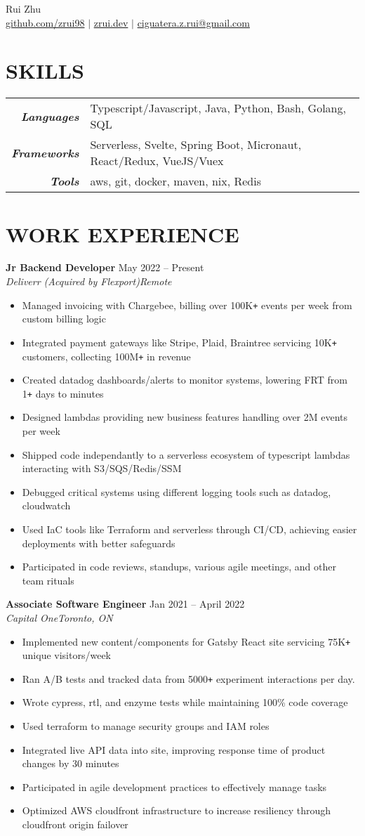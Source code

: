 \documentclass[letterpaper]{article}
\newcommand{\Header}[2]{\begin{center}
	\huge\usefont{OT1}{lmss}{m}{n}
		#1 \\
	\small{#2}
\end{center}}
\newcommand{\SplitEntry}[2]{\textbf{\textit{#1}} & \small{#2}\\}
\newcommand{\NewPart}[1]{\section*{\large\uppercase{\textbf{#1}}}}
\newcommand{\DatedEntry}[5]{\small\textbf{#1}
	\hfill \small{#2}\\
	\textit{#3}\hfill\textit{#4}\\\vspace{0.1cm}
	#5\vspace{0.1cm}
}
\begin{document}
\Header{Rui Zhu}{\href{https://github.com/zrui98}{github.com/zrui98} $|$ \href{https://zrui.dev}{zrui.dev} $|$ \href{mailto:ciguatera.z.rui@gmail.ca}{ciguatera.z.rui@gmail.com}}\vspace{-0.5cm}

\NewPart{Skills}
\begin{tabular}{r|l}
	\SplitEntry{Languages}{Typescript/Javascript, Java, Python, Bash, Golang, SQL}
	\SplitEntry{Frameworks}{Serverless, Svelte, Spring Boot, Micronaut, React/Redux, VueJS/Vuex}
	\SplitEntry{Tools}{aws, git, docker, maven, nix, Redis}
\end{tabular}\vspace{-0.2cm}

\NewPart{Work Experience}
\DatedEntry{Jr Backend Developer}
{May 2022 -- Present}
{Deliverr (Acquired by Flexport)}
{Remote}
{\begin{itemize}[nolistsep]
	\item Managed invoicing with Chargebee, billing over 100K\texttt{+} events per week from custom billing logic
	\item Integrated payment gateways like Stripe, Plaid, Braintree servicing 10K\texttt{+} customers, collecting 100M\texttt{+} in revenue
	\item Created datadog dashboards/alerts to monitor systems, lowering FRT from 1\texttt{+} days to minutes
	\item Designed lambdas providing new business features handling over 2M events per week
	\item Shipped code independantly to a serverless ecosystem of typescript lambdas interacting with S3/SQS/Redis/SSM
	\item Debugged critical systems using different logging tools such as datadog, cloudwatch
	\item Used IaC tools like Terraform and serverless through CI/CD, achieving easier deployments with better safeguards
	\item Participated in code reviews, standups, various agile meetings, and other team rituals
\end{itemize}}
\DatedEntry{Associate Software Engineer}
{Jan 2021 -- April 2022}
{Capital One}
{Toronto, ON}
{\begin{itemize}[nolistsep]
	\item Implemented new content/components for Gatsby React site servicing 75K\texttt{+} unique visitors/week
	\item Ran A/B tests and tracked data from 5000\texttt{+} experiment interactions per day.
	\item Wrote cypress, rtl, and enzyme tests while maintaining 100\% code coverage
	\item Used terraform to manage security groups and IAM roles
	\item Integrated live API data into site, improving response time of product changes by 30 minutes
	\item Participated in agile development practices to effectively manage tasks 
	\item Optimized AWS cloudfront infrastructure to increase resiliency through cloudfront origin failover
\end{itemize}}
\end{document}
